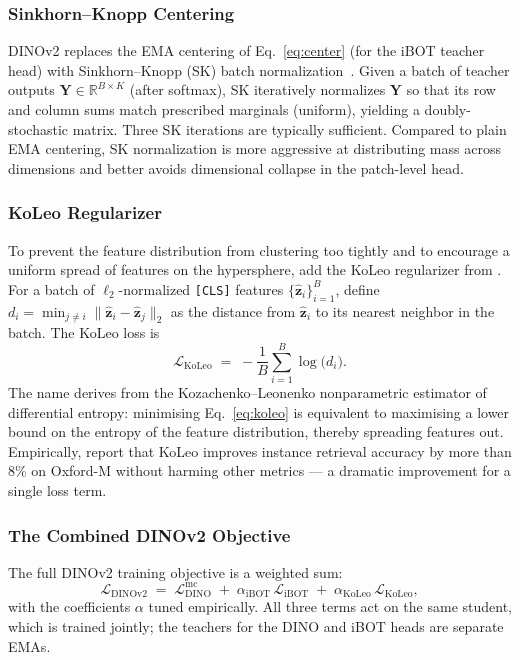 \documentclass[11pt,a4paper]{article}
\newcommand{\R}{\mathbb{R}}
\newcommand{\vect}[1]{\mathbf{#1}}
\newcommand{\loss}{\mathcal{L}}
\begin{document}
\subsubsection{Sinkhorn--Knopp Centering}

DINOv2 replaces the EMA centering of Eq.~\eqref{eq:center} (for the iBOT
teacher head) with Sinkhorn--Knopp (SK) batch
normalization~\citep{caron2020unsupervised}. Given a batch of teacher
outputs $\vect{Y} \in \R^{B \times K}$ (after softmax), SK iteratively
normalizes $\vect{Y}$ so that its row and column sums match prescribed
marginals (uniform), yielding a doubly-stochastic
matrix. Three SK iterations are typically sufficient. Compared to plain
EMA centering, SK normalization is more aggressive at distributing mass
across dimensions and better avoids dimensional collapse in the patch-level
head.

\subsubsection{KoLeo Regularizer}

To prevent the feature distribution from clustering too tightly and to
encourage a uniform spread of features on the hypersphere,
\citet{oquab2024dinov2} add the KoLeo regularizer from
\citet{sablayrolles2018spreading}. For a batch of $\ell_{2}$-normalized
\texttt{[CLS]} features $\{\hat{\vect{z}}_{i}\}_{i=1}^{B}$, define
$d_{i} = \min_{j \neq i} \|\hat{\vect{z}}_{i} - \hat{\vect{z}}_{j}\|_{2}$
as the distance from $\hat{\vect{z}}_{i}$ to its nearest neighbor in the
batch. The KoLeo loss is
\begin{equation}
\loss_{\text{KoLeo}} \;=\; -\frac{1}{B}\sum_{i=1}^{B} \log\bigl(d_{i}\bigr).
\label{eq:koleo}
\end{equation}
The name derives from the Kozachenko--Leonenko nonparametric estimator of
differential entropy: minimising Eq.~\eqref{eq:koleo} is equivalent to
maximising a lower bound on the entropy of the feature distribution,
thereby spreading features out. Empirically,
\citet{oquab2024dinov2} report that KoLeo improves instance retrieval
accuracy by more than 8\% on Oxford-M without harming other metrics --- a
dramatic improvement for a single loss term.

\subsubsection{The Combined DINOv2 Objective}

The full DINOv2 training objective is a weighted sum:
\begin{equation}
\loss_{\text{DINOv2}}
\;=\;
\loss_{\text{DINO}}^{\text{mc}}
\;+\;
\alpha_{\text{iBOT}}\, \loss_{\text{iBOT}}
\;+\;
\alpha_{\text{KoLeo}}\, \loss_{\text{KoLeo}},
\label{eq:dinov2-total}
\end{equation}
with the coefficients $\alpha$ tuned empirically. All three terms act on
the same student, which is trained jointly; the teachers for the DINO
and iBOT heads are separate EMAs.
\end{document}
